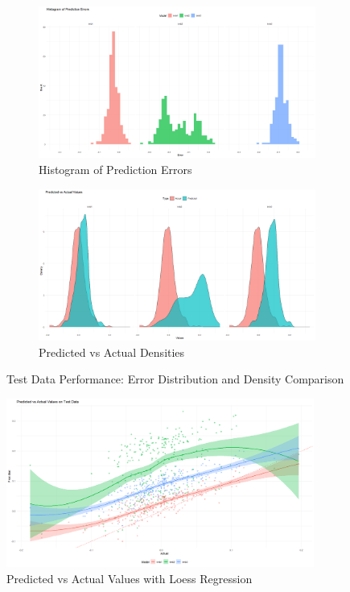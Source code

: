 \documentclass[12pt, twoside,hidelinks]{article}
\theoremstyle{definition}
\numberwithin{equation}{section}
\begin{document}
\begin{figure}[H]
    \centering
    \begin{subfigure}[b]{0.45\textwidth}
        \includegraphics[width=\textwidth]{visuals/Visuals_ts_ridge/hist_pred_errors.png}
        \caption{Histogram of Prediction Errors}
        \label{fig:hist_pred_errors}
    \end{subfigure}
    \hfill
    \begin{subfigure}[b]{0.45\textwidth}
        \includegraphics[width=\textwidth]{visuals/Visuals_ts_ridge/Predicted_vs_actual_densities_ts_ridge.png}
        \caption{Predicted vs Actual Densities}
        \label{fig:predicted_vs_actual_densities}
    \end{subfigure}
    \caption{Test Data Performance: Error Distribution and Density Comparison}
    \label{fig:test_data_performance_1}
\end{figure}


\begin{figure}[H]
    \centering
    \includegraphics[width=0.9\textwidth]{visuals/Visuals_ts_ridge/predicted_vs_actual_test_data_lines.png}
    \caption{Predicted vs Actual Values with Loess Regression}
    \label{fig:predicted_vs_actual_lines}
\end{figure}
\end{document}
